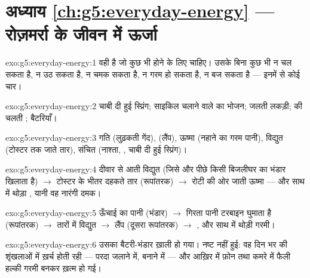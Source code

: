 \section*{अध्याय \ref{ch:g5:everyday-energy} --- रोज़मर्रा के जीवन में ऊर्जा}

\begin{solution}{exo:g5:everyday-energy:1}
 वही है जो कुछ भी होने के लिए चाहिए। उसके बिना कुछ भी न चल सकता
है, न उठ सकता है, न चमक सकता है, न गरम हो सकता है, न बज सकता है ---
इनमें से कोई चार।
\end{solution}

\begin{solution}{exo:g5:everyday-energy:2}
चाबी दी हुई स्प्रिंग; साइकिल चलाने वाले का भोजन; जलती लकड़ी;  की
चलती ; बैटरियाँ।
\end{solution}

\begin{solution}{exo:g5:everyday-energy:3}
गति (लुढ़कती गेंद),  (लैंप), ऊष्मा (नहाने का गरम पानी), विद्युत
(टोस्टर तक जाते तार), संचित (नाश्ता, , चाबी दी हुई स्प्रिंग)।
\end{solution}

\begin{solution}{exo:g5:everyday-energy:4}
दीवार से आती विद्युत  (जिसे और पीछे किसी बिजलीघर का भंडार खिलाता
है) $\to$ टोस्टर के भीतर दहकते तार (रूपांतरक) $\to$ रोटी की ओर जाती
ऊष्मा --- और साथ में थोड़ा , यानी वह नारंगी दमक।
\end{solution}

\begin{solution}{exo:g5:everyday-energy:5}
ऊँचाई का पानी (भंडार) $\to$ गिरता पानी टरबाइन घुमाता है (रूपांतरक)
$\to$ तारों में विद्युत  $\to$ लैंप (दूसरा रूपांतरक) $\to$
, और साथ में थोड़ी गरमी।
\end{solution}

\begin{solution}{exo:g5:everyday-energy:6}
उसका बैटरी-भंडार ख़ाली हो गया।  नष्ट नहीं हुई: वह दिन भर की
शृंखलाओं में ख़र्च होती रही --- परदा जलाने में,  बनाने में ---
और आख़िर में फ़ोन तथा कमरे में फैली हल्की गरमी बनकर ख़त्म हो गई।
\end{solution}


